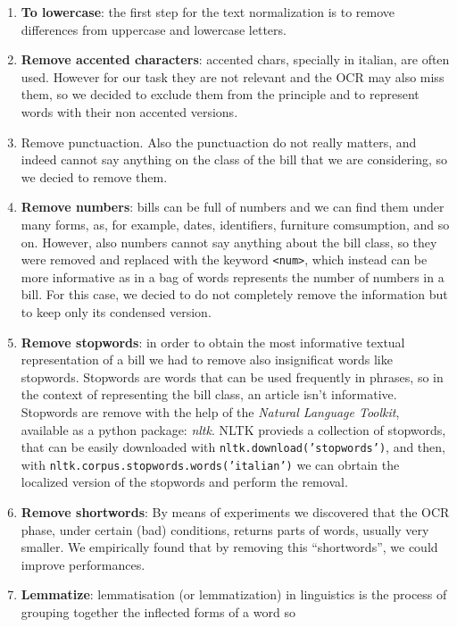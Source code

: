 \documentclass[10pt,twocolumn,letterpaper]{article}
\newcommand\codeinline[1]{\texttt{#1}}  %
\begin{document}
\begin{enumerate}
  \item \textbf{To lowercase}: the first step for the text normalization is to
    remove differences from uppercase and lowercase letters.
  \item \textbf{Remove accented characters}: accented chars, specially in
    italian, are often used. However for our task they are not relevant
    and the OCR may also miss them, so we decided to exclude them from
    the principle and to represent words with their non accented
    versions.
  \item Remove punctuaction. Also the punctuaction do not really
    matters, and indeed cannot say anything on the class of the bill
    that we are considering, so we decied to remove them.
  \item \textbf{Remove numbers}: bills can be full of numbers and we can find
    them under many forms, as, for example, dates, identifiers,
    furniture comsumption, and so on. However, also numbers cannot say
    anything about the bill class, so they were removed and replaced
    with the keyword \codeinline{<num>}, which instead can be more
    informative as in a bag of words represents the number of numbers
    in a bill. For this case, we decied to do not completely remove
    the information but to keep only its condensed version.
  \item \textbf{Remove stopwords}: in order to obtain the most informative
    textual representation of a bill we had to remove also
    insignificat words like stopwords. Stopwords are words that can be
    used frequently in phrases, so in the context of representing the
    bill class, an article isn't informative. Stopwords are remove
    with the help of the \emph{Natural Language Toolkit}, available as
    a python package: \emph{nltk}. NLTK provieds a collection of
    stopwords, that can be easily downloaded with
    \codeinline{nltk.download('stopwords')}, and then, with
    \codeinline{nltk.corpus.stopwords.words('italian')} we can obrtain the
    localized version of the stopwords and perform the removal.
  \item \textbf{Remove shortwords}: By means of experiments we discovered that
    the OCR phase, under certain (bad) conditions, returns parts of
    words, usually very smaller. We empirically found that by removing
    this ``shortwords'', we could improve performances.
  \item \textbf{Lemmatize}: lemmatisation (or lemmatization) in linguistics is
    the process of grouping together the inflected forms of a word so

\end{enumerate}
\end{document}
